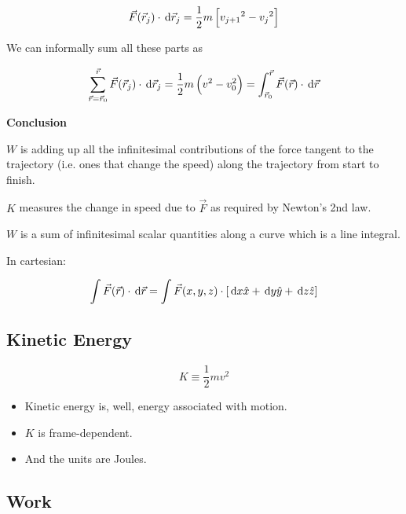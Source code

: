 \begin{equation}
	\vec F(\vec r_j) \cdot \D \vec r_j = \frac{1}{2} m \left[{v_{j+1}}^2 - {v_j}^2\right]
\end{equation}

We can informally sum all these parts as

\begin{equation}
	\sum_{\vec r = \vec r_0}^{\vec r} \vec F(\vec r_j) \cdot \D \vec r_j = \frac{1}{2} m \left(v^2 - v_0^2\right) = \int_{\vec r_0}^{\vec r} \vec F(\vec r) \cdot \D \vec r
\end{equation}

\textbf{Conclusion}

$W$ is adding up all the infinitesimal contributions of the force tangent to the trajectory (i.e. ones that change the speed) along the trajectory from start to finish.

$K$ measures the change in speed due to $\vec F$ as required by Newton's 2nd law.

$W$ is a sum of infinitesimal scalar quantities along a curve which is a line integral.

In cartesian:

\begin{equation}
	\int \vec F(\vec r) \cdot \D \vec r = \int \vec F(x, y, z) \cdot \left[\D x \hat x + \D y \hat y + \D z \hat z\right]
\end{equation}

\subsection{Kinetic Energy}

\begin{equation}
	K \equiv \frac{1}{2}mv^2
\end{equation}

\begin{itemize}
	\item Kinetic energy is, well, energy associated with motion.

	\item $K$ is frame-dependent.
	
	\item And the units are Joules.
\end{itemize}

\subsection{Work}

